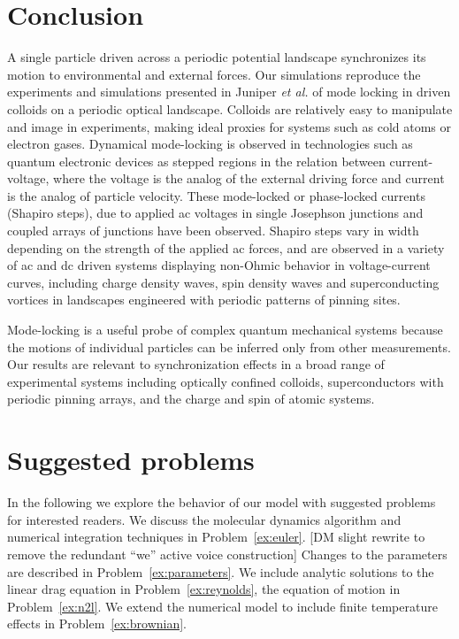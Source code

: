\documentclass[preprint,showpacs,preprintnumbers,amsmath,amssymb,aps,prb]{revtex4-1}
\theoremstyle{remark}
\begin{document}
\section{Conclusion}
\label{sec:conclusion}	
A single particle driven across a periodic potential landscape 
synchronizes its motion 
to environmental and external forces.  
Our simulations reproduce the experiments and simulations presented in 
Juniper {\it et al.} \cite{Juniper2015, Juniper2017}
of 
mode locking in
driven colloids on a
periodic optical landscape.
Colloids are 
relatively easy to 
manipulate and image in experiments,
making ideal proxies 
for systems 
such as cold atoms or electron gases.\cite{Grier2003}
Dynamical mode-locking 
is 
observed in  technologies such as 
 quantum electronic
devices as 
stepped regions in the relation between current-voltage,
where the voltage is the analog of the external driving force
and current is the analog of particle velocity.
These mode-locked or phase-locked currents (Shapiro steps), 
due to applied ac voltages in 
single Josephson junctions\cite{Shapiro1963, Golubov2004} and
coupled arrays of junctions have been observed.\cite{Benz1990}
Shapiro steps vary in width depending on the strength of the
applied ac forces,
and are observed in a variety of ac and dc driven systems
displaying
non-Ohmic behavior in voltage-current curves,
including
charge density waves, spin density waves
and superconducting vortices in landscapes 
engineered with periodic patterns of pinning sites.\cite{Reichhardt2000}

Mode-locking is a useful probe 
of complex quantum mechanical systems
because the motions of individual particles can  be inferred only
from other measurements.
Our results are relevant 
to synchronization effects
in a broad range of experimental systems
including optically confined colloids,
superconductors with periodic pinning arrays, 
and the charge and spin of atomic systems.

\section{Suggested problems}
\label{sec:problems}	

In the following
we explore the behavior of our model
with suggested problems for interested readers.
We discuss the molecular dynamics algorithm
and
numerical integration techniques in Problem~\ref{ex:euler}.
[DM slight rewrite to remove the redundant ``we'' active voice construction]
Changes to the parameters are described in 
Problem~\ref{ex:parameters}.
We include analytic solutions to  the 
linear drag equation in Problem~\ref{ex:reynolds}, 
the equation of motion in Problem~\ref{ex:n2l}.
We extend the numerical model %
to include finite temperature effects
in Problem~\ref{ex:brownian}.
\end{document}
